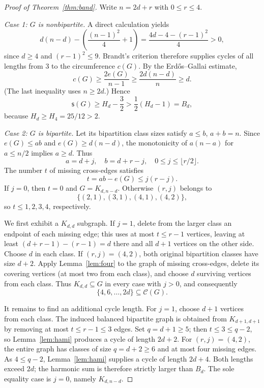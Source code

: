 \documentclass[11pt,letterpaper]{article}
\newcommand{\cset}{\mathcal{C}}
\newcommand{\hc}{\mathsf{s}}
\newcommand{\edges}{e}
\begin{document}
\begin{proof}[Proof of Theorem~\ref{thm:band}]
Write $n=2d+r$ with $0\le r\le4$.

\emph{Case 1: $G$ is nonbipartite.}
A direct calculation yields
\begin{equation}\label{eq:brandt-diff}
 d(n-d)-\left(\frac{(n-1)^2}{4}+1\right)
 =\frac{4d-4-(r-1)^2}{4}>0,
\end{equation}
since $d\ge4$ and $(r-1)^2\le9$.
Brandt's criterion therefore supplies cycles of all lengths
from 3 to the circumference $c(G)$.
By the Erd\H{o}s--Gallai estimate,
\[
 c(G)\ge\frac{2\edges(G)}{n-1}
 \ge\frac{2d(n-d)}{n}\ge d.
\]
(The last inequality uses $n\ge2d$.)  Hence
\[
\hc(G)\ge H_d-\frac32
>\frac12(H_d-1)=B_d,
\]
because $H_d\ge H_4=25/12>2$.

\emph{Case 2: $G$ is bipartite.}
Let its bipartition class sizes satisfy $a\le b$, $a+b=n$.
Since $\edges(G)\le ab$ and $\edges(G)\ge d(n-d)$,
the monotonicity of $a(n-a)$ for $a\le n/2$ implies $a\ge d$.
Thus
\[
 a=d+j,\quad b=d+r-j,\quad
 0\le j\le\lfloor r/2\rfloor.
\]
The number $t$ of missing cross-edges satisfies
\begin{equation}\label{eq:missing}
 t=ab-\edges(G)\le j(r-j).
\end{equation}
If $j=0$, then $t=0$ and $G=K_{d,n-d}$.
Otherwise $(r,j)$ belongs to
\[
\{(2,1),(3,1),(4,1),(4,2)\},
\]
so $t\le1,2,3,4$, respectively.

We first exhibit a $K_{d,d}$ subgraph.  If $j=1$, delete
from the larger class an endpoint of each missing edge;
this uses at most $t\le r-1$ vertices, leaving at least
$(d+r-1)-(r-1)=d$ there and all $d+1$ vertices on
the other side.  Choose $d$ in each class.
If $(r,j)=(4,2)$, both original bipartition classes have
size $d+2$.  Apply Lemma~\ref{lem:four} to the graph of
missing cross-edges, delete its covering vertices (at most
two from each class), and choose $d$ surviving vertices
from each class.  Thus $K_{d,d}\subseteq G$ in every case
with $j>0$, and consequently
\[
\{4,6,\ldots,2d\}\subseteq\cset(G).
\]

It remains to find an additional cycle length.  For $j=1$,
choose $d+1$ vertices from each class.  The induced balanced
bipartite graph is obtained from $K_{d+1,d+1}$ by removing
at most $t\le r-1\le3$ edges.  Set $q=d+1\ge5$;
then $t\le3\le q-2$, so Lemma~\ref{lem:hami}
produces a cycle of length $2d+2$.
For $(r,j)=(4,2)$, the entire graph has classes of size
$q=d+2\ge6$ and at most four missing edges.  As
$4\le q-2$, Lemma~\ref{lem:hami} supplies a cycle of
length $2d+4$.
Both lengths exceed $2d$; the harmonic sum is therefore
strictly larger than $B_d$.  The sole equality case is
$j=0$, namely $K_{d,n-d}$.
\end{proof}
\end{document}
